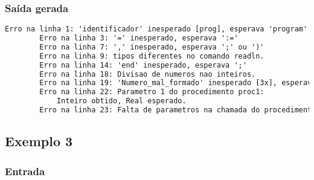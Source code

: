\documentclass{article}
\begin{document}
		\subsubsection*{Saída gerada} %
		\label{ssub:sa_da_gerada}
		\begin{lstlisting}[language=TeX]
		Erro na linha 1: 'identificador' inesperado [prog], esperava 'program'
		Erro na linha 3: '=' inesperado, esperava ':='
		Erro na linha 7: ',' inesperado, esperava ';' ou ')'
		Erro na linha 9: tipos diferentes no comando readln.
		Erro na linha 14: 'end' inesperado, esperava ';'
		Erro na linha 18: Divisao de numeros nao inteiros.
		Erro na linha 19: 'Numero_mal_formado' inesperado [3x], esperava 'identificador' ou '(' ou 'numero_inteiro' ou 'numero_real'
		Erro na linha 22: Parametro 1 do procedimento proc1:
			Inteiro obtido, Real esperado. 
		Erro na linha 23: Falta de parametros na chamada do procedimento proc2. 1 parametro	
		\end{lstlisting}

	\subsection{Exemplo 3} %
	\label{sub:exemplo_3}
		\subsubsection*{Entrada} %
		\label{ssub:entrada}
		
\end{document}
